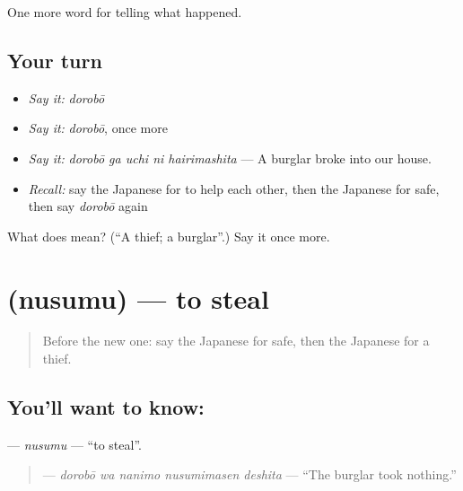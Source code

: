\begin{grammarlens}[title={What you've built}]
One more word for telling what happened.
\end{grammarlens}

\subsection*{Your turn}
\begin{itemize}
\raggedright
  \item \emph{Say it:} \emph{dorobō}
  \item \emph{Say it:} \emph{dorobō}, once more
  \item \emph{Say it:} \emph{dorobō ga uchi ni hairimashita} — A burglar broke into our house.
  \item \emph{Recall:} say the Japanese for to help each other, then the Japanese for safe, then say \emph{dorobō} again
\end{itemize}

\begin{tcolorbox}[breakable,colback=teal!4,colframe=teal!35!black,title={Before you move on}]
What does  mean? (\textquotedblleft{}A thief; a burglar\textquotedblright{}.) Say it once more.
\end{tcolorbox}
\section[\texorpdfstring{\ja{ぬすむ} (nusumu)}{ぬすむ (nusumu)}]{ (nusumu) — to steal}

\label{lesson:JA-C269-nusumu}



\begin{quote}
Before the new one: say the Japanese for safe, then the Japanese for a thief.
\end{quote}

\subsection*{You'll want to know: }
\textbf{} — \emph{nusumu} — \textquotedblleft{}to steal\textquotedblright{}.

\begin{quote}
\textbf{  } — \emph{dorobō wa nanimo nusumimasen deshita} — \textquotedblleft{}The burglar took nothing.\textquotedblright{}
\end{quote}


